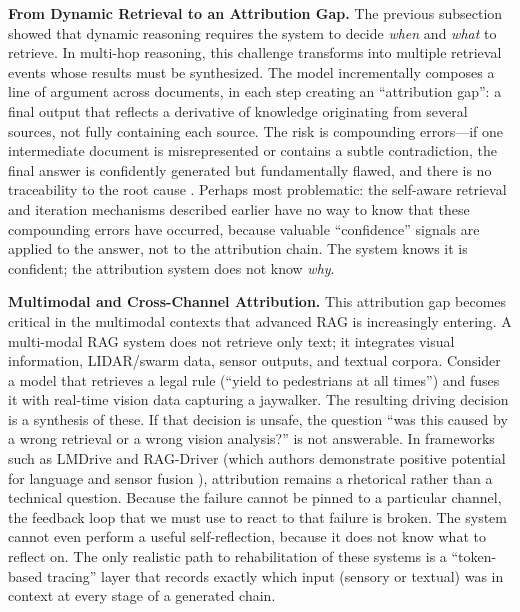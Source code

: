 \documentclass[11pt]{article}
\begin{document}
\textbf{From Dynamic Retrieval to an Attribution Gap.} The previous subsection showed that dynamic reasoning requires the system to decide \emph{when} and \emph{what} to retrieve. In multi-hop reasoning, this challenge transforms into multiple retrieval events whose results must be synthesized. The model incrementally composes a line of argument across documents, in each step creating an ``attribution gap'': a final output that reflects a derivative of knowledge originating from several sources, not fully containing each source. The risk is compounding errors---if one intermediate document is misrepresented or contains a subtle contradiction, the final answer is confidently generated but fundamentally flawed, and there is no traceability to the root cause \cite{ref256}. Perhaps most problematic: the self-aware retrieval and iteration mechanisms described earlier have no way to know that these compounding errors have occurred, because valuable ``confidence'' signals are applied to the answer, not to the attribution chain. The system knows it is confident; the attribution system does not know \emph{why}.

\textbf{Multimodal and Cross-Channel Attribution.} This attribution gap becomes critical in the multimodal contexts that advanced RAG is increasingly entering. A multi-modal RAG system does not retrieve only text; it integrates visual information, LIDAR/swarm data, sensor outputs, and textual corpora. Consider a model that retrieves a legal rule (``yield to pedestrians at all times'') and fuses it with real-time vision data capturing a jaywalker. The resulting driving decision is a synthesis of these. If that decision is unsafe, the question ``was this caused by a wrong retrieval or a wrong vision analysis?'' is not answerable. In frameworks such as LMDrive and RAG-Driver (which authors demonstrate positive potential for language and sensor fusion \cite{ref257,ref206}), attribution remains a rhetorical rather than a technical question. Because the failure cannot be pinned to a particular channel, the feedback loop that we must use to react to that failure is broken. The system cannot even perform a useful self-reflection, because it does not know what to reflect on. The only realistic path to rehabilitation of these systems is a ``token-based tracing'' layer that records exactly which input (sensory or textual) was in context at every stage of a generated chain.
\end{document}
